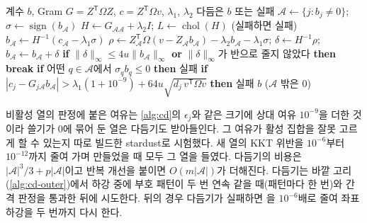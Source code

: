 \begin{algorithm}[htbp]
\begin{algorithmic}[1]
\Require 계수 $b$, Gram $G=Z^{\mathsf T}\Omega Z$, $c=Z^{\mathsf T}\Omega v$, $\lambda_1$, $\lambda_2$
\Ensure 다듬은 $b$ 또는 실패
\State $\mathcal A\gets\{j:b_j\ne0\}$; $\sigma\gets\operatorname{sign}(b_{\mathcal A})$ 
\State $H\gets G_{\mathcal A\mathcal A}+\lambda_2I$; $L\gets\operatorname{chol}(H)$ (실패하면 실패)
\State $b_{\mathcal A}\gets H^{-1}(c_{\mathcal A}-\lambda_1\sigma)$
 
   
    \State $\rho\gets Z_{\mathcal A}^{\mathsf T}\Omega(v-Z_{\mathcal A}b_{\mathcal A})-\lambda_2b_{\mathcal A}-\lambda_1\sigma$; $\delta\gets H^{-1}\rho$; $b_{\mathcal A}\gets b_{\mathcal A}+\delta$
    \State \textbf{if} $\|\delta\|_\infty\le4u\|b_{\mathcal A}\|_\infty$ \textbf{or} $\|\delta\|_\infty$가 반으로 줄지 않았다 \textbf{then} \textbf{break}
  \EndFor
\EndIf
\State \textbf{if} 어떤 $q\in\mathcal A$에서 $\sigma_qb_q\le0$ \textbf{then} 실패 
  \State \textbf{if} $|c_j-G_{j\mathcal A}b_{\mathcal A}|>\lambda_1(1+10^{-9})+64u\sqrt{d_j\,v^{\mathsf T}\Omega v}$ \textbf{then} 실패
\EndFor
\State \Return $b$ ($\mathcal A$ 밖은 $0$)
\end{algorithmic}
\caption{라소·엘라스틱넷의 KKT 다듬기 (stardust 의 )}
\label{alg:polish}
\end{algorithm}

비활성 열의 판정에 붙은 여유는 \cref{alg:cd}의 $\epsilon_j$와 같은 크기에 상대 여유 $10^{-9}$을 더한 것이라 쓸기가 $0$에 묶어 둔 열은 다듬기도 받아들인다. 그 여유가 활성 집합을 잘못 고르게 할 수 있는지 따로 빌드한 stardust로 시험했다. 새 열의 KKT 위반을 $10^{-6}$부터 $10^{-12}$까지 줄여 가며 만들었을 때 모두 그 열을 들였다. 다듬기의 비용은 $|\mathcal A|^3/3+p|\mathcal A|$이고 반복 개선을 붙이면 $O(m|\mathcal A|)$가 더해진다. 다듬기는 바깥 고리(\cref{alg:cd-outer})에서 하강 중에 부호 패턴이 두 번 연속 같을 때(패턴마다 한 번)와 간격 판정을 통과한 뒤에 시도한다. 뒤의 경우 다듬기가 실패하면 을 $10^{-6}$배로 줄여 좌표 하강을 두 번까지 다시 한다.


